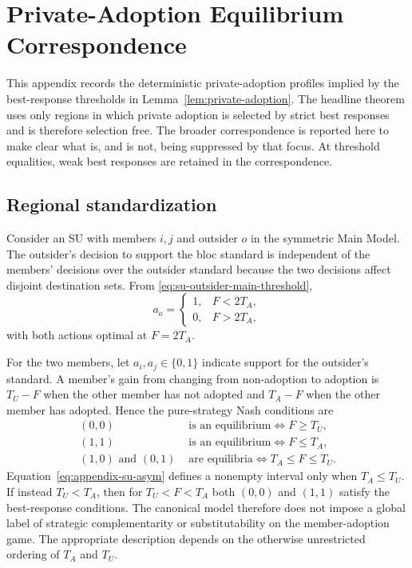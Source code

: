 \section{Private-Adoption Equilibrium Correspondence}
\label{app:adoption-equilibria}

This appendix records the deterministic private-adoption profiles implied by the best-response thresholds in Lemma~\ref{lem:private-adoption}. The headline theorem uses only regions in which private adoption is selected by strict best responses and is therefore selection free. The broader correspondence is reported here to make clear what is, and is not, being suppressed by that focus. At threshold equalities, weak best responses are retained in the correspondence.

\subsection{Regional standardization}

Consider an SU with members $i,j$ and outsider $o$ in the symmetric Main Model. The outsider's decision to support the bloc standard is independent of the members' decisions over the outsider standard because the two decisions affect disjoint destination sets. From \eqref{eq:su-outsider-main-threshold},
\[
a_o=
\begin{cases}
1,&F<2T_A,\\
0,&F>2T_A,
\end{cases}
\]
with both actions optimal at $F=2T_A$.

For the two members, let $a_i,a_j\in\{0,1\}$ indicate support for the outsider's standard. A member's gain from changing from non-adoption to adoption is $T_U-F$ when the other member has not adopted and $T_A-F$ when the other member has adopted. Hence the pure-strategy Nash conditions are
\begin{align}
(0,0)&\text{ is an equilibrium}\iff F\ge T_U,\label{eq:appendix-su-00}\\
(1,1)&\text{ is an equilibrium}\iff F\le T_A,\label{eq:appendix-su-11}\\
(1,0)\text{ and }(0,1)&\text{ are equilibria}\iff T_A\le F\le T_U.\label{eq:appendix-su-asym}
\end{align}
Equation~\eqref{eq:appendix-su-asym} defines a nonempty interval only when $T_A\le T_U$. If instead $T_U<T_A$, then for $T_U<F<T_A$ both $(0,0)$ and $(1,1)$ satisfy the best-response conditions. The canonical model therefore does not impose a global label of strategic complementarity or substitutability on the member-adoption game. The appropriate description depends on the otherwise unrestricted ordering of $T_A$ and $T_U$.

